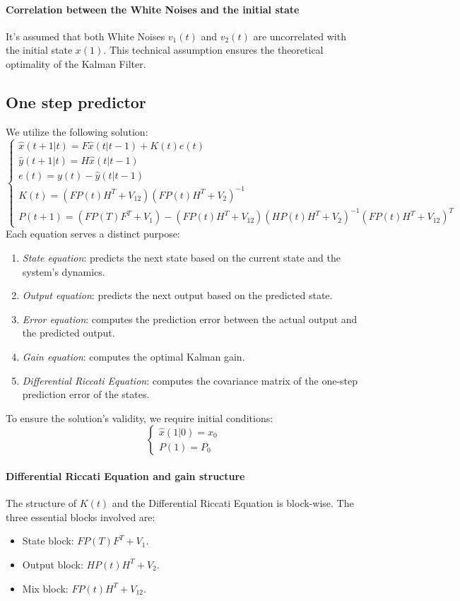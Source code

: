 \paragraph*{Correlation between the White Noises and the initial state}
It's assumed that both White Noises $v_1(t)$ and $v_2(t)$ are uncorrelated with the initial state $x(1)$. 
This technical assumption ensures the theoretical optimality of the Kalman Filter.

\subsection{One step predictor}
We utilize the following solution:
\[\begin{cases}
    \hat{x}(t+1|t)=F\hat{x}(t|t-1)+K(t)e(t) \\ 
    \hat{y}(t+1|t)=H\hat{x}(t|t-1) \\
    e(t)=y(t)-\hat{y}(t|t-1) \\
    K(t)=\left(FP(t)H^T+V_{12}\right)\left(FP(t)H^T+V_2\right)^{-1} \\
    P(t+1)=\left(FP(T)F^T+V_1\right)-\left(FP(t)H^T+V_{12}\right)\left(HP(t)H^T+V_{2}\right)^{-1}\left(FP(t)H^T+V_{12}\right)^T
\end{cases}\]
Each equation serves a distinct purpose:
\begin{enumerate}
    \item \textit{State equation}: predicts the next state based on the current state and the system's dynamics.
    \item \textit{Output equation}: predicts the next output based on the predicted state.
    \item \textit{Error equation}: computes the prediction error between the actual output and the predicted output.
    \item \textit{Gain equation}: computes the optimal Kalman gain.
    \item \textit{Differential Riccati Equation}: computes the covariance matrix of the one-step prediction error of the states.
\end{enumerate}
To ensure the solution's validity, we require initial conditions:
\[\begin{cases}
    \hat{x}(1|0)=x_0 \\
    P(1)=P_0
\end{cases}\]

\paragraph*{Differential Riccati Equation and gain structure}
The structure of $K(t)$ and the Differential Riccati Equation  is block-wise. 
The three essential blocks involved are:
\begin{itemize}
    \item State block: $FP(T)F^T+V_1$.
    \item Output block: $HP(t)H^T+V_{2}$.
    \item Mix block: $FP(t)H^T+V_{12}$.
\end{itemize}

